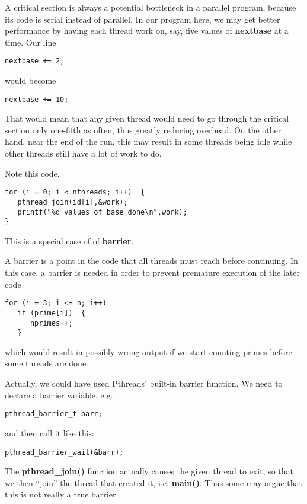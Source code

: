 A critical section is always a potential bottleneck in a parallel
program, because its code is serial instead of parallel.  In our program
here, we may get better performance by having each thread work on, say,
five values of {\bf nextbase} at a time.  Our line

\begin{Verbatim}
nextbase += 2;
\end{Verbatim}

would become

\begin{Verbatim}
nextbase += 10;
\end{Verbatim}

That would mean that any given thread would need to go through the
critical section only one-fifth as often, thus greatly reducing
overhead.  On the other hand, near the end of the run, this may result
in some threads being idle while other threads still have a lot of work
to do.


Note this code.

\begin{Verbatim}
for (i = 0; i < nthreads; i++)  {
   pthread_join(id[i],&work);
   printf("%d values of base done\n",work);
}
\end{Verbatim}

This is a special case of of {\bf barrier}.

A barrier is a point in the code that all threads must reach before
continuing.  In this case, a barrier is needed in order to prevent
premature execution of the later code

\begin{Verbatim}
for (i = 3; i <= n; i++)
   if (prime[i])  {
      nprimes++;
   }
\end{Verbatim}

which would result in possibly wrong output if we start counting primes
before some threads are done.

Actually, we could have used Pthreads' built-in barrier function.  We
need to declare a barrier variable, e.g.

\begin{lstlisting}
pthread_barrier_t barr;
\end{lstlisting}

and then call it like this:

\begin{lstlisting}
pthread_barrier_wait(&barr);
\end{lstlisting}

The {\bf pthread\_join()} function actually causes the given thread to
exit, so that we then ``join'' the thread that created it, i.e. {\bf
main()}.  Thus some may argue that this is not really a true barrier.

